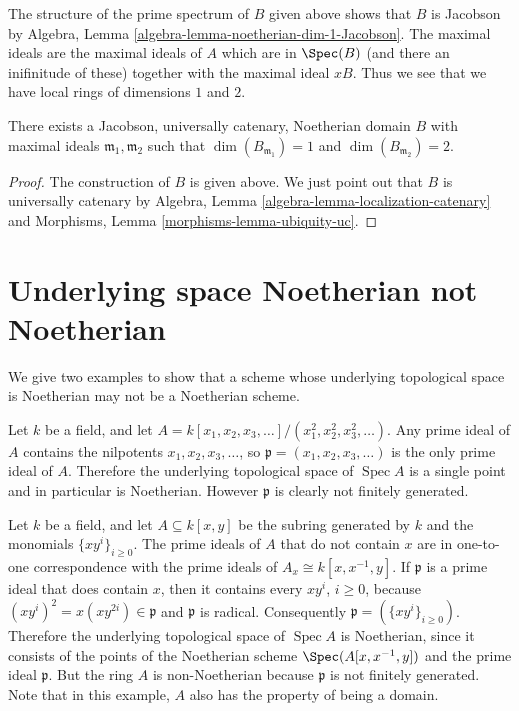 \medskip\noindent
The structure of the prime spectrum of $B$ given above
shows that $B$ is Jacobson by
Algebra, Lemma \ref{algebra-lemma-noetherian-dim-1-Jacobson}.
The maximal ideals are the maximal ideals of $A$
which are in $\Spec(B)$ (and there an inifinitude of these)
together with the maximal ideal $xB$. Thus we see that we have
local rings of dimensions $1$ and $2$.

\begin{lemma}
\label{lemma-Noetherian-Jacobson}
There exists a Jacobson, universally catenary, Noetherian domain $B$
with maximal ideals $\mathfrak m_1, \mathfrak m_2$ such that
$\dim(B_{\mathfrak m_1}) = 1$ and $\dim(B_{\mathfrak m_2}) = 2$.
\end{lemma}

\begin{proof}
The construction of $B$ is given above. We just point out that
$B$ is universally catenary by
Algebra, Lemma \ref{algebra-lemma-localization-catenary} and
Morphisms, Lemma \ref{morphisms-lemma-ubiquity-uc}.
\end{proof}




\section{Underlying space Noetherian not Noetherian}
\label{section-noetherian-not-noetherian}

\noindent
We give two examples to show that a scheme whose underlying topological space
is Noetherian may not be a Noetherian scheme.

\begin{example}
\label{example-many-variables}
Let $k$ be a field, and let $A = k[x_1, x_2, x_3, \dots] /
(x_1^2, x_2^2, x_3^2, \dots)$.  Any prime ideal of $A$ contains the
nilpotents $x_1, x_2, x_3, \dots$, so $\mathfrak p = (x_1, x_2, x_3,
\dots)$ is the only prime ideal of $A$.  Therefore the underlying
topological space of $\operatorname{Spec} A$ is a single point and in
particular is Noetherian.  However $\mathfrak p$ is clearly not finitely
generated.
\end{example}

\begin{example}
\label{example-many-mononials}
Let $k$ be a field, and let $A \subseteq k[x, y]$ be the
subring generated by $k$ and the monomials $\{xy^i\}_{i \ge 0}$.  The prime
ideals of $A$ that do not contain $x$ are in one-to-one correspondence with
the prime ideals of $A_x \cong k[x, x^{-1}, y]$.  If $\mathfrak p$ is a
prime ideal that does contain $x$, then it contains every $xy^i$, $i \ge 0$,
because $(xy^i)^2 = x(xy^{2i}) \in \mathfrak p$ and $\mathfrak p$ is
radical.  Consequently $\mathfrak p = (\{xy^i\}_{i \ge 0})$.  Therefore the
underlying topological space of $\operatorname{Spec} A$ is Noetherian, since
it consists of the points of the Noetherian scheme
$\Spec(A[x, x^{-1}, y])$ and the prime ideal $\mathfrak p$.
But the ring $A$ is non-Noetherian because $\mathfrak p$
is not finitely generated.  Note that
in this example, $A$ also has the property of being a domain.
\end{example}






